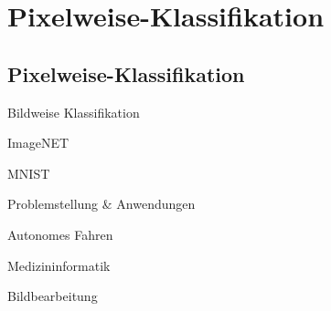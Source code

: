 \section{Pixelweise-Klassifikation}

\subsection*{Pixelweise-Klassifikation}

\begin{frame}{Bildweise Klassifikation}

\begin{minipage}{0.49\textwidth}
\begin{center}
ImageNET
\end{center}
\vspace{1cm}
\end{minipage}
\begin{minipage}{0.49\textwidth}
\begin{center}
MNIST
\end{center}
\vspace{1cm}
\end{minipage}

\end{frame}


\begin{frame}{Problemstellung \& Anwendungen}

\begin{minipage}{0.49\textwidth}
\begin{center}
Autonomes Fahren
\end{center}
\vspace{1cm}
\end{minipage}
\begin{minipage}{0.49\textwidth}
\begin{center}
Medizininformatik
\end{center}
\vspace{1cm}
\end{minipage}

\begin{center}
Bildbearbeitung
\end{center}



\end{frame}

